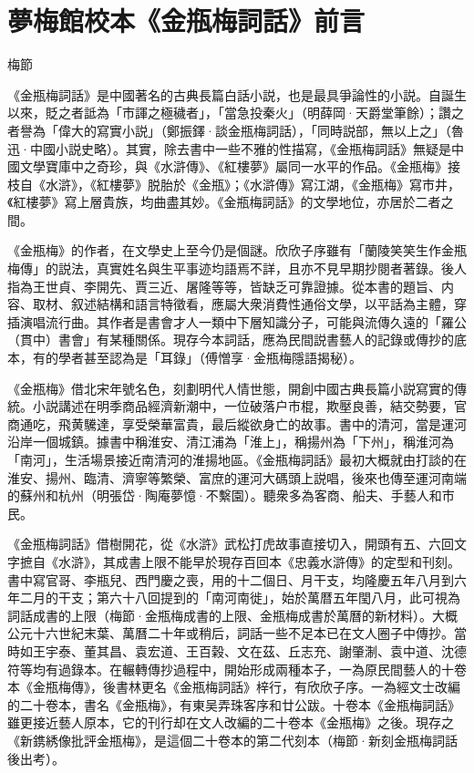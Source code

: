 \chapter*{夢梅館校本《金瓶梅詞話》前言}

\begin{declareqianyan}
梅節\qquad\ 
\end{declareqianyan}

《金瓶梅詞話》是中國著名的古典長篇白話小説，也是最具爭論性的小説。自誕生以來，貶之者詆為「市諢之極穢者」，「當急投秦火」{\innerzhushi（明薛岡·天爵堂筆餘）}；讚之者譽為「偉大的寫實小説」{\innerzhushi（鄭振鐸·談金瓶梅詞話）}，「同時説部，無以上之」{\innerzhushi（魯迅·中國小説史略）}。其實，除去書中一些不雅的性描寫，《金瓶梅詞話》無疑是中國文學寶庫中之奇珍，與《水滸傳》、《紅樓夢》屬同一水平的作品。《金瓶梅》接枝自《水滸》，《紅樓夢》脱胎於《金瓶》；《水滸傳》寫江湖，《金瓶梅》寫市井，《紅樓夢》寫上層貴族，均曲盡其妙。《金瓶梅詞話》的文學地位，亦居於二者之間。

《金瓶梅》的作者，在文學史上至今仍是個謎。欣欣子序雖有「蘭陵笑笑生作金瓶梅傳」的説法，真實姓名與生平事迹均語焉不詳，且亦不見早期抄閱者著錄。後人指為王世貞、李開先、賈三近、屠隆等等，皆缺乏可靠證據。從本書的題旨、内容、取材、叙述結構和語言特徵看，應屬大衆消費性通俗文學，以平話為主體，穿插演唱流行曲。其作者是書會才人一類中下層知識分子，可能與流傳久遠的「羅公（貫中）書會」有某種關係。現存今本詞話，應為民間説書藝人的記錄或傳抄的底本，有的學者甚至認為是「耳錄」{\innerzhushi（傅憎享·金瓶梅隱語揭秘）}。

《金瓶梅》借北宋年號名色，刻劃明代人情世態，開創中國古典長篇小説寫實的傳統。小説講述在明季商品經濟新潮中，一位破落户市棍，欺壓良善，結交勢要，官商通吃，飛黄驣達，享受榮華富貴，最后縱欲身亡的故事。書中的清河，當是運河沿岸一個城鎮。據書中稱淮安、清江浦為「淮上」，稱揚州為「下州」，稱淮河為「南河」，生活場景接近南清河的淮揚地區。《金瓶梅詞話》最初大概就由打談的在淮安、揚州、臨清、濟寧等繁榮、富庶的運河大碼頭上説唱，後來也傳至運河南端的蘇州和杭州{\innerzhushi（明張岱·陶庵夢憶·不繫園）}。聽衆多為客商、船夫、手藝人和市民。

《金瓶梅詞話》借樹開花，從《水滸》武松打虎故事直接切入，開頭有五、六回文字摭自《水滸》，其成書上限不能早於現存百回本《忠義水滸傳》的定型和刊刻。書中寫官哥、李瓶兒、西門慶之喪，用的十二個日、月干支，均隆慶五年八月到六年二月的干支；第六十八回提到的「南河南徙」，始於萬暦五年閠八月，此可視為詞話成書的上限{\innerzhushi（梅節·金瓶梅成書的上限、金瓶梅成書於萬曆的新材料）}。大概公元十六世紀末葉、萬曆二十年或稍后，詞話一些不足本已在文人圈子中傳抄。當時如王宇泰、董其昌、袁宏道、王百榖、文在茲、丘志充、謝肇淛、袁中道、沈德符等均有過錄本。在輾轉傳抄過程中，開始形成兩種本子，一為原民間藝人的十卷本《金瓶梅傳》，後書林更名《金瓶梅詞話》梓行，有欣欣子序。一為經文士改編的二十卷本，書名《金瓶梅》，有東吴弄珠客序和廿公跋。十卷本《金瓶梅詞話》雖更接近藝人原本，它的刊行却在文人改編的二十卷本《金瓶梅》之後。現存之《新鎸綉像批評金瓶梅》，是這個二十卷本的第二代刻本{\innerzhushi（梅節·新刻金瓶梅詞話後出考）}。

